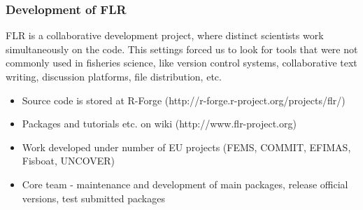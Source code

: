 \documentclass{beamer}%
\begin{document}
\begin{frame}
  \frametitle{Development of FLR}
  
FLR is a collaborative development project, where distinct scientists work simultaneously on the code. This settings forced us to look for tools that were not commonly used in fisheries science, like version control systems, collaborative text writing, discussion platforms, file distribution, etc.

      \begin{itemize}
	 \item<2-> Source code is stored at R-Forge (http://r-forge.r-project.org/projects/flr/) 
	 \item<3-> Packages and tutorials etc. on wiki (http://www.flr-project.org)
	 \item<4-> Work developed under number of EU projects (FEMS, COMMIT, EFIMAS, Fisboat, UNCOVER)
	 \item<5-> Core team - maintenance and development of main packages, release official versions, test submitted packages
   \end{itemize}
\end{frame}
\end{document}
